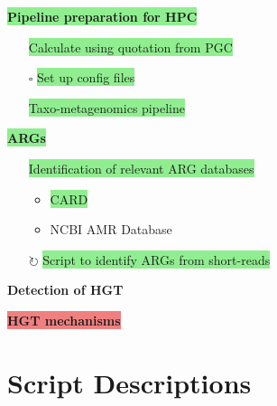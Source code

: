\documentclass[11pt]{report}
\newcommand{\done}{\checkmark}  %
\newcommand{\pending}{$\square$}  %
\newcommand{\refine}{$\circlearrowright$}  %
\newcommand{\highlightessential}[1]{\colorbox{lightgreen}{#1}}  %
\newcommand{\highlightoptional}[1]{\colorbox{lightorange}{#1}}  %
\newcommand{\highlightrobust}[1]{\colorbox{lightcoral}{#1}}  %
\begin{document}
\begin{multicols}{2}
\begin{itemize}
	\end{itemize}
\par\noindent\highlightessential{\textbf{\large Pipeline preparation for HPC}}
\begin{itemize}
	\item [\done] \highlightessential{Calculate using quotation from PGC}
	\item [\pending] \highlightessential{Set up config files}  %
	\item [\done] \highlightessential{Taxo-metagenomics pipeline}	
\end{itemize}

\par\noindent\highlightessential{\textbf{\large ARGs}}  %
\begin{itemize}
	\item [\done] \highlightessential{Identification of relevant ARG databases}
	\begin{itemize}
		\item \highlightessential{CARD}
		\item \highlightoptional{NCBI AMR Database}
	\end{itemize}
	\item [\refine]\highlightessential{Script to identify ARGs from short-reads}
\end{itemize}
\par\noindent\highlightoptional{{\textbf{\large Detection of HGT}}}	

\par\noindent\highlightrobust{{\textbf{\large HGT mechanisms}}}
\onecolumn
\newpage
\setcounter{section}{1}  %
\end{multicols}


\newpage
\onecolumn

\section*{\centering \huge \textbf{Script Descriptions}}  %
\end{document}
